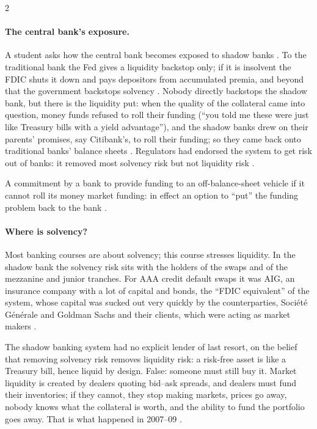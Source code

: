 \begin{paracol}{2}
\paragraph{The central bank's exposure.} A student asks how the central bank becomes exposed to shadow banks . To the traditional
bank the Fed gives a liquidity backstop only; if it is insolvent the FDIC shuts it down and pays depositors from accumulated premia, and beyond that the
government backstops solvency . Nobody directly backstops the shadow bank, but there is the liquidity put: when the quality of the
collateral came into question, money funds refused to roll their funding (``you told me these were just like Treasury bills with a yield advantage''), and the
shadow banks drew on their parents' promises, say Citibank's, to roll their funding; so they came back onto traditional banks' balance sheets
. Regulators had endorsed the system to get risk out of banks: it removed most solvency risk but not liquidity risk
.

\begin{definition}
A commitment by a bank to provide funding to an off-balance-sheet vehicle if it cannot roll its money market funding: in effect an option to ``put'' the funding
problem back to the bank .
\end{definition}

\paragraph{Where is solvency?} Most banking courses are about solvency; this course stresses liquidity. In the shadow bank the solvency risk sits with the holders of
the swaps and of the mezzanine and junior tranches. For AAA credit default swaps it was AIG, an insurance company with a lot of capital and bonds, the ``FDIC
equivalent'' of the system, whose capital was sucked out very quickly by the counterparties, Soci\'et\'e G\'en\'erale and Goldman Sachs and their clients, which were
acting as market makers .

\begin{intuition}
The shadow banking system had no explicit lender of last resort, on the belief that removing solvency risk removes liquidity risk: a risk-free asset is like a
Treasury bill, hence liquid by design. False: someone must still buy it. Market liquidity is created by dealers quoting bid--ask spreads, and dealers must fund
their inventories; if they cannot, they stop making markets, prices go away, nobody knows what the collateral is worth, and the ability to fund the portfolio goes
away. That is what happened in 2007--09 .
\end{intuition}


\end{paracol}
